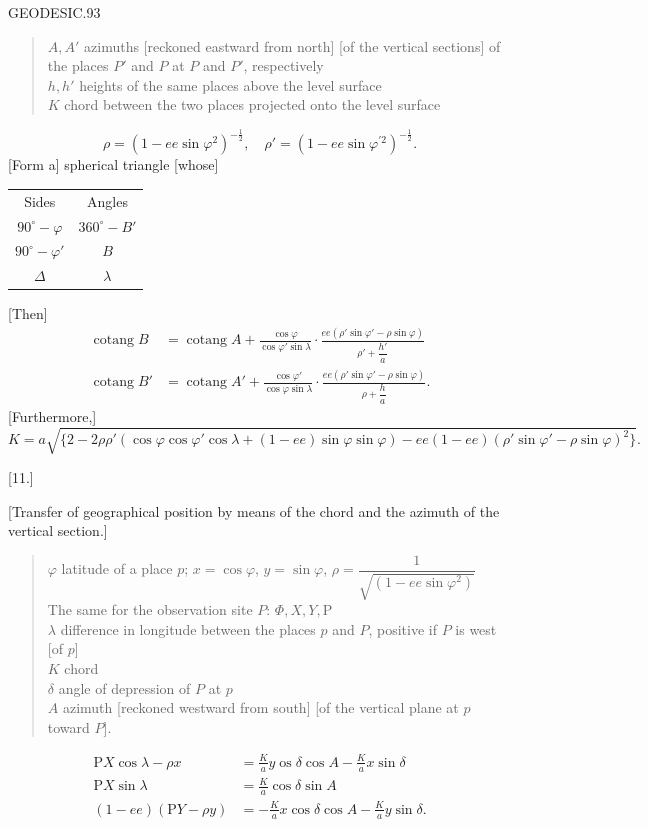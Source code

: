 \clearpage
\noindent\mbox{}\hfill GEODESIC.\hfill 93\par
\begin{quote}
$A,A'$ azimuths [reckoned eastward from north] [of the vertical sections] of the places $P'$ and $P$ at $P$ and $P'$, respectively\\
$h,h'$ heights of the same places above the level surface\\
$K$ chord between the two places projected onto the level surface
\end{quote}
\[
\rho=(1-ee\sin\varphi^2)^{-\frac12},\quad\rho'=(1-ee\sin\varphi^{\prime2})^{-\frac12}.
\]
[Form a] spherical triangle [whose]
\begin{center}
\begin{tabular}{cc}
Sides&Angles\\
$90^\circ-\varphi$&$360^\circ-B'$\\
$90^\circ-\varphi'$&$B$\\
$\Delta$&$\lambda$
\end{tabular}
\end{center}
[Then]
\[
\begin{aligned}
\operatorname{cotang}B&=\operatorname{cotang}A+\frac{\cos\varphi}{\cos\varphi'\sin\lambda}\cdot\frac{ee(\rho'\sin\varphi'-\rho\sin\varphi)}{\rho'+\dfrac{h'}a}\\
\operatorname{cotang}B'&=\operatorname{cotang}A'+\frac{\cos\varphi'}{\cos\varphi\sin\lambda}\cdot\frac{ee(\rho'\sin\varphi'-\rho\sin\varphi)}{\rho+\dfrac ha}.
\end{aligned}
\]
[Furthermore,]
\[
K=a\sqrt{\{2-2\rho\rho'(\cos\varphi\cos\varphi'\cos\lambda+(1-ee)\sin\varphi\sin\varphi)-ee(1-ee)(\rho'\sin\varphi'-\rho\sin\varphi)^2\}}.
\]
\begin{center}[11.]\end{center}
\begin{center}[Transfer of geographical position by means of the chord and the azimuth of the vertical section.]\end{center}
\begin{quote}
$\varphi$ latitude of a place $p$; $x=\cos\varphi$, $y=\sin\varphi$, $\rho=\dfrac1{\sqrt{(1-ee\sin\varphi^2)}}$\\
The same for the observation site $P$: $\Phi,X,Y,\mathrm P$\\
$\lambda$ difference in longitude between the places $p$ and $P$, positive if $P$ is west [of $p$]\\
$K$ chord\\
$\delta$ angle of depression of $P$ at $p$\\
$A$ azimuth [reckoned westward from south] [of the vertical plane at $p$ toward $P$].
\end{quote}
\[
\begin{aligned}
\mathrm PX\cos\lambda-\rho x&=\frac Ka y\mathop{\dot{\mathrm c}\mathrm{os}}\delta\cos A-\frac Ka x\sin\delta\\
\mathrm PX\sin\lambda&=\frac Ka\cos\delta\sin A\\
(1-ee)(\mathrm PY-\rho y)&=-\frac Ka x\cos\delta\cos A-\frac Ka y\sin\delta.
\end{aligned}
\]

